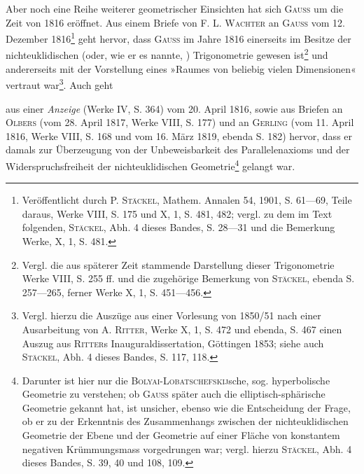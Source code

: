 Aber noch eine Reihe weiterer geometrischer Einsichten hat sich \textsc{Gauss}
um die Zeit von 1816 eröffnet. Aus einem Briefe von \textsc{F. L. Wachter} an
\textsc{Gauss} vom 12. Dezember 1816\footnote{Veröffentlicht durch \textsc{P. Stäckel}, Mathem. Annalen 54, 1901, S. 61—69, Teile daraus, Werke VIII, S. 175 und X, 1, S. 481, 482; vergl. zu dem im Text folgenden, \textsc{Stäckel}, Abh. 4 dieses Bandes, S. 28—31 und die Bemerkung Werke, X, 1, S. 481.} geht hervor, dass \textsc{Gauss} im Jahre 1816
einerseits im Besitze der nichteuklidischen (oder, wie er es nannte, )
Trigonometrie gewesen ist\footnote{Vergl. die aus späterer Zeit stammende Darstellung dieser Trigonometrie Werke VIII, S. 255 ff. und die zugehörige Bemerkung von \textsc{Stäckel}, ebenda S. 257—265, ferner Werke X, 1, S. 451—456.} und andererseits mit der Vorstellung
eines »Raumes von beliebig vielen Dimensionen« vertraut war\footnote{Vergl. hierzu die Auszüge aus einer Vorlesung von 1850/51 nach einer Ausarbeitung von \textsc{A. Ritter}, Werke X, 1, S. 472 und ebenda, S. 467 einen Auszug aus \textsc{Ritter}s Inauguraldissertation, Göttingen 1853; siehe auch \textsc{Stäckel}, Abh. 4 dieses Bandes, S. 117, 118.}. Auch geht
\par\clearpage{}
\noindent aus einer \textit{Anzeige} (Werke IV, S. 364) vom 20. April 1816, sowie aus Briefen
an \textsc{Olbers} (vom 28. April 1817, Werke VIII, S. 177) und an \textsc{Gerling} (vom
11. April 1816, Werke VIII, S. 168 und vom 16. März 1819, ebenda S. 182)
hervor, dass er damals zur Überzeugung von der Unbeweisbarkeit des Parallelenaxioms
und der Widerspruchsfreiheit der nichteuklidischen Geometrie\footnote{Darunter ist hier nur die \textsc{Bolyai-Lobatschefskij}sche, sog. hyperbolische Geometrie zu verstehen; ob \textsc{Gauss} später auch die elliptisch-sphärische Geometrie gekannt hat, ist unsicher, ebenso wie die Entscheidung der Frage, ob er zu der Erkenntnis des Zusammenhangs zwischen der nichteuklidischen Geometrie der Ebene und der Geometrie auf einer Fläche von konstantem negativen Krümmungsmass vorgedrungen war; vergl. hierzu \textsc{Stäckel}, Abh. 4 dieses Bandes, S. 39, 40 und 108, 109.}
gelangt war.

